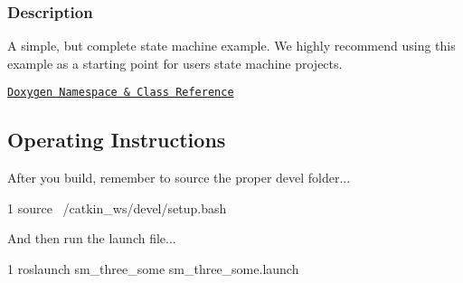 \subsubsection*{Description}

A simple, but complete state machine example. We highly recommend using this example as a starting point for users state machine projects.~\newline


\href{https://reelrbtx.github.io/SMACC/master/html/namespacesm__three__some.html}{\tt Doxygen Namespace \& Class Reference}

\subsection*{Operating Instructions}

After you build, remember to source the proper devel folder...


\begin{DoxyCode}
1 source ~/catkin\_ws/devel/setup.bash
\end{DoxyCode}


And then run the launch file...


\begin{DoxyCode}
1 roslaunch sm\_three\_some sm\_three\_some.launch
\end{DoxyCode}
 